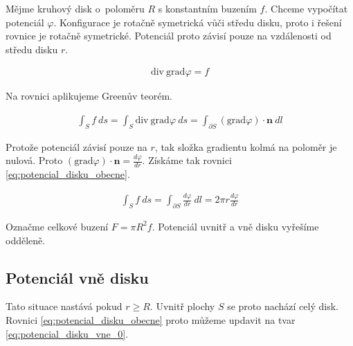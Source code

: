 \documentclass{book}
\newcommand{\vect}[1]{\boldsymbol{#1}}
\newcommand{\grad}{\mathrm{grad}}
\newcommand{\diverg}{\mathrm{div}}
\begin{document}
Mějme kruhový disk o~poloměru \(R\) s konstantním buzením \(f\). Chceme vypočítat potenciál \(\varphi\). Konfigurace je rotačně symetrická vůči středu
disku, proto i řešení rovnice je rotačně symetrické. Potenciál proto závisí pouze na vzdálenosti od středu disku \(r\).




\begin{equation}
\begin{split}
\diverg \ \grad \varphi = f
\end{split}
\end{equation}

Na rovnici aplikujeme Greenův teorém.

\begin{equation}
\begin{split}
\int_S f \ ds = \int_S \diverg \ \grad \varphi \ ds = \int_{\partial S} (\grad \varphi) \cdot \vect{n} \ dl
\end{split}
\end{equation}

Protože potenciál závisí pouze na \(r\), tak složka gradientu kolmá na poloměr je nulová. Proto \((\grad \varphi) \cdot \vect{n} = \frac{d \varphi}{dr}\).
Získáme tak rovnici \eqref{eq:potencial_disku_obecne}.

\begin{equation}
\label{eq:potencial_disku_obecne}
\begin{split}
\int_S f \ ds = \int_{\partial S} \frac{d \varphi}{dr} \ dl = 2 \pi r \frac{d \varphi}{dr}
\end{split}
\end{equation}

Označme celkové buzení \(F = \pi R^2 f\).
Potenciál uvnitř a vně disku vyřešíme odděleně.

\subsection{Potenciál vně disku}

Tato situace nastává pokud \(r \geq R\). Uvnitř plochy \(S\) se proto nachází celý disk. Rovnici \eqref{eq:potencial_disku_obecne} proto můžeme updavit na tvar \eqref{eq:potencial_disku_vne_0}.
\end{document}

